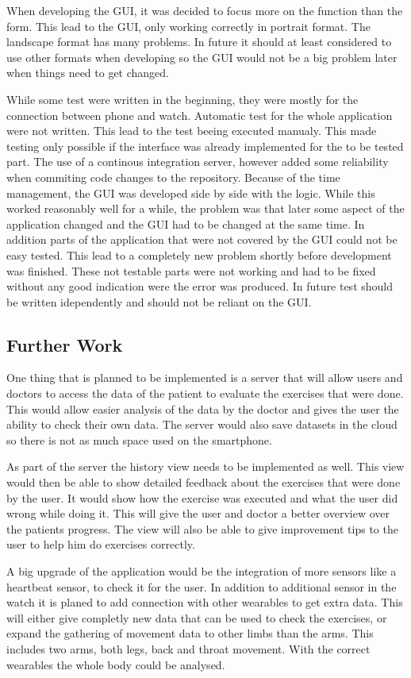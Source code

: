 When developing the GUI, it was decided to focus more on the function than the form. This lead to the GUI, only working correctly in portrait format. The landscape format has many problems. In future it should at least considered to use other formats when developing so the GUI would not be a big problem later when things need to get changed.


While some test were written in the beginning, they were mostly for the connection between phone and watch. Automatic test for the whole application were not written. This lead to the test beeing executed manualy. This made testing only possible if the interface was already implemented for the to be tested part. The use of a continous integration server, however added some reliability when commiting code changes to the repository.
Because of the time management, the GUI was developed side by side with the logic. While this worked reasonably well for a while, the problem was that later some aspect of the application changed and the GUI had to be changed at the same time.
In addition parts of the application that were not covered by the GUI could not be easy tested. This lead to a completely new problem shortly before development was finished. These not testable parts were not working and had to be fixed without any good indication were the error was produced.
In future test should be written idependently and should not be reliant on the GUI.

\subsection{Further Work}
One thing that is planned to be implemented is a server that will allow users and doctors to access the data of the patient to evaluate the exercises that were done. This would allow easier analysis of the data by the doctor and gives the user the ability to check their own data.
The server would also save datasets in the cloud so there is not as much space used on the smartphone.

As part of the server the history view needs to be implemented as well. This view would then be able to show detailed feedback about the exercises that were done by the user. It would show how the exercise was executed and what the user did wrong while doing it. This will give the user and doctor a better overview over the patients progress. The view will also be able to give improvement tips to the user to help him do exercises correctly.

A big upgrade of the application would be the integration of more sensors like a heartbeat sensor, to check it for the user. In addition to additional sensor in the watch it is planed to add connection with other wearables to get extra data. This will either give completly new data that can be used to check the exercises, or expand the gathering of movement data to other limbs than the arms. This includes two arms, both legs, back and throat movement. With the correct wearables the whole body could be analysed.

